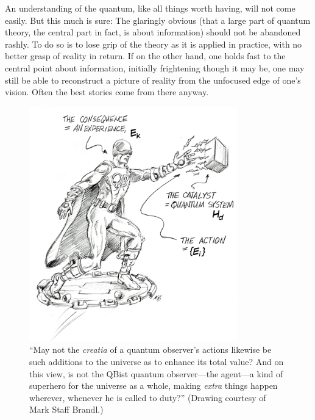 \documentclass[aps,pra,superscriptaddress,12pt,tightenlines,nofootinbib]{revtex4-2}
\begin{document}
An understanding of the quantum, like all things worth having, will not come easily.  But this much is sure:  The glaringly obvious (that a large part of quantum theory, the central part in fact, is about information) should not be abandoned rashly.  To do so is to lose grip of the theory as it is applied in practice, with no better grasp of reality in return.  If on the other hand, one holds fast to the central point about information, initially frightening though it may be, one may still be able to reconstruct a picture of reality from the unfocused edge of one's vision.  Often the best stories come from there anyway.


\begin{figure}[h]
\begin{center}
\includegraphics[height=4.0in]{BrandlSketch.jpg}
\end{center}
\caption{``May not the {\it creatia\/} of a quantum observer's actions likewise be such additions to the universe as to enhance its total value?  And on this view, is not the QBist quantum observer---the agent---a kind of superhero for the universe as a whole, making {\it extra\/} things happen wherever, whenever he is called to duty?'' {\footnotesize (Drawing courtesy of Mark Staff Brandl.)}}
\end{figure}
\end{document}
